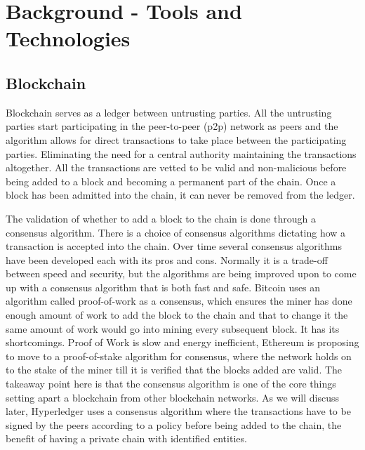 
\chapter{Background - Tools and Technologies}
\label{ch:background}

\section{Blockchain}
Blockchain \cite{p2p-bitcoin} serves as a ledger between untrusting parties. All the untrusting parties start participating in the peer-to-peer (p2p) network as peers and the algorithm allows for direct transactions to take place between the participating parties. Eliminating the need for a central authority maintaining the transactions altogether. All the transactions are vetted to be valid and non-malicious before being added to a block and becoming a permanent part of the chain. Once a block has been admitted into the chain, it can never be removed from the ledger. 

\bigskip
The validation of whether to add a block to the chain is done through a consensus algorithm. There is a choice of consensus algorithms dictating how a transaction is accepted into the chain. Over time several consensus algorithms have been developed each with its pros and cons. Normally it is a trade-off between speed and security, but the algorithms are being improved upon to come up with a consensus algorithm that is both fast and safe. Bitcoin uses an algorithm called proof-of-work as a consensus, which ensures the miner has done enough amount of work to add the block to the chain and that to change it the same amount of work would go into mining every subsequent block. It has its shortcomings. Proof of Work is slow and energy inefficient, Ethereum is proposing to move to a proof-of-stake algorithm for consensus, where the network holds on to the stake of the miner till it is verified that the blocks added are valid. The takeaway point here is that the consensus algorithm is one of the core things setting apart a blockchain from other blockchain networks. As we will discuss later, Hyperledger uses a consensus algorithm where the transactions have to be signed by the peers according to a policy before being added to the chain, the benefit of having a private chain with identified entities.

